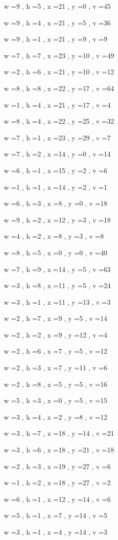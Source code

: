 \documentclass[11pt]{article}
\begin{document}
w =9 , h =5 , x =21 , y =0 , v =45
\par
w =9 , h =4 , x =21 , y =5 , v =36
\par
w =9 , h =1 , x =21 , y =9 , v =9
\par
w =7 , h =7 , x =23 , y =10 , v =49
\par
w =2 , h =6 , x =21 , y =10 , v =12
\par
w =8 , h =8 , x =22 , y =17 , v =64
\par
w =1 , h =4 , x =21 , y =17 , v =4
\par
w =8 , h =4 , x =22 , y =25 , v =32
\par
w =7 , h =1 , x =23 , y =29 , v =7
\par
w =7 , h =2 , x =14 , y =0 , v =14
\par
w =6 , h =1 , x =15 , y =2 , v =6
\par
w =1 , h =1 , x =14 , y =2 , v =1
\par
w =6 , h =3 , x =8 , y =0 , v =18
\par
w =9 , h =2 , x =12 , y =3 , v =18
\par
w =4 , h =2 , x =8 , y =3 , v =8
\par
w =8 , h =5 , x =0 , y =0 , v =40
\par
w =7 , h =9 , x =14 , y =5 , v =63
\par
w =3 , h =8 , x =11 , y =5 , v =24
\par
w =3 , h =1 , x =11 , y =13 , v =3
\par
w =2 , h =7 , x =9 , y =5 , v =14
\par
w =2 , h =2 , x =9 , y =12 , v =4
\par
w =2 , h =6 , x =7 , y =5 , v =12
\par
w =2 , h =3 , x =7 , y =11 , v =6
\par
w =2 , h =8 , x =5 , y =5 , v =16
\par
w =5 , h =3 , x =0 , y =5 , v =15
\par
w =3 , h =4 , x =2 , y =8 , v =12
\par
w =3 , h =7 , x =18 , y =14 , v =21
\par
w =3 , h =6 , x =18 , y =21 , v =18
\par
w =2 , h =3 , x =19 , y =27 , v =6
\par
w =1 , h =2 , x =18 , y =27 , v =2
\par
w =6 , h =1 , x =12 , y =14 , v =6
\par
w =5 , h =1 , x =7 , y =14 , v =5
\par
w =3 , h =1 , x =4 , y =14 , v =3
\par
\newpage
\end{document}
